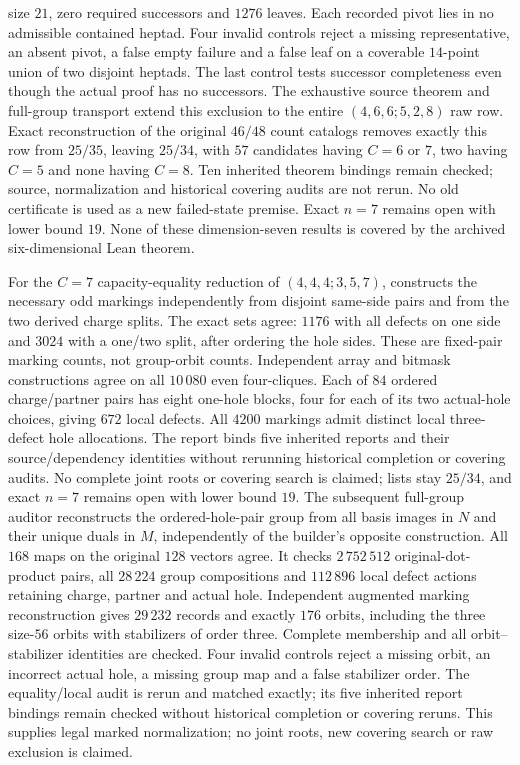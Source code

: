 size $21$, zero required successors and $1276$ leaves. Each recorded
pivot lies in no admissible contained heptad. Four invalid controls
reject a missing representative, an absent pivot, a false empty failure
and a false leaf on a coverable $14$-point union of two disjoint heptads.
The last control tests successor completeness even though the actual
proof has no successors. The exhaustive source theorem and full-group
transport extend this exclusion to the entire $(4,6,6;5,2,8)$ raw row.
Exact reconstruction of the original $46/48$ count catalogs removes
exactly this row from $25/35$, leaving $25/34$, with $57$ candidates
having $C=6$ or $7$, two having $C=5$ and none having $C=8$.
Ten inherited theorem bindings remain checked; source, normalization
and historical covering audits are not rerun. No old certificate is
used as a new failed-state premise. Exact $n=7$ remains open with
lower bound $19$.
None of these dimension-seven results is covered by the archived
six-dimensional Lean theorem.

For the $C=7$ capacity-equality reduction of $(4,4,4;3,5,7)$,
 constructs
the necessary odd markings independently from disjoint same-side
pairs and from the two derived charge splits. The exact sets agree:
$1176$ with all defects on one side and $3024$ with a one/two split,
after ordering the hole sides. These are fixed-pair marking counts,
not group-orbit counts. Independent array and bitmask constructions
agree on all $10\,080$ even four-cliques. Each of $84$ ordered
charge/partner pairs has eight one-hole blocks, four for each of
its two actual-hole choices, giving $672$ local defects. All $4200$
markings admit distinct local three-defect hole allocations.
The report binds five inherited reports and their source/dependency
identities without rerunning historical completion or covering audits.
No complete joint roots or covering search is claimed; lists stay
$25/34$, and exact $n=7$ remains open with lower bound $19$.
The subsequent full-group auditor
reconstructs the ordered-hole-pair group from all basis images in
$N$ and their unique duals in $M$, independently of the builder's
opposite construction. All $168$ maps on the original $128$ vectors
agree. It checks $2\,752\,512$ original-dot-product pairs, all
$28\,224$ group compositions and $112\,896$ local defect actions
retaining charge, partner and actual hole. Independent augmented
marking reconstruction gives $29\,232$ records and exactly $176$
orbits, including the three size-$56$ orbits with stabilizers of
order three. Complete membership and all orbit--stabilizer identities
are checked. Four invalid controls reject a missing orbit, an
incorrect actual hole, a missing group map and a false stabilizer
order. The equality/local audit is rerun and matched exactly; its
five inherited report bindings remain checked without historical
completion or covering reruns. This supplies legal marked
normalization; no joint roots, new covering search or raw exclusion
is claimed.
